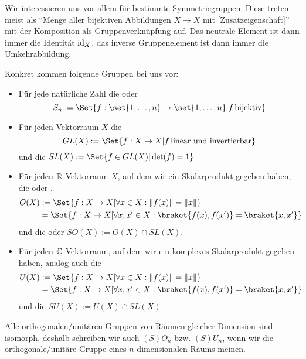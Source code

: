 \begin{example}
Wir interessieren uns vor allem für bestimmte Symmetriegruppen. Diese treten meist als \enquote{Menge aller bijektiven Abbildungen $X\to X$ mit [Zusatzeigenschaft]} mit der Komposition als Gruppenverknüpfung auf. Das neutrale Element ist dann immer die Identität $\operatorname{id}_X$, das inverse Gruppenelement ist dann immer die Umkehrabbildung.

Konkret kommen folgende Gruppen bei uns vor:
\begin{itemize}
\item Für jede natürliche Zahl die  oder 
\[S_n := \Set{f: \set{1,\ldots,n}\to\set{1,\ldots,n} | f\,\text{bijektiv}}\]
\item Für jeden Vektorraum $X$ die 
\[GL(X):=\Set{f: X\to X | f\,\text{linear und invertierbar}}\]
und die  $SL(X):=\Set{f\in GL(X) | \det(f)=1}$
\item Für jeden $\mathbb{R}$-Vektorraum $X$, auf dem wir ein Skalarprodukt gegeben haben, die  oder .
\begin{align*}
O(X) &:= \Set{f: X\to X | \forall x\in X: \norm{f(x)}=\norm{x}}\\
&=\Set{f: X\to X | \forall x,x'\in X: \braket{f(x),f(x')}=\braket{x,x'}}
\end{align*}
und die  oder  $SO(X) := O(X) \cap SL(X)$.
\item Für jeden $\mathbb{C}$-Vektorraum, auf dem wir ein komplexes Skalarprodukt gegeben haben, analog auch die 
\begin{align*}
U(X) &:= \Set{f: X\to X | \forall x\in X: \norm{f(x)}=\norm{x}}\\
&=\Set{f: X\to X | \forall x,x'\in X: \braket{f(x),f(x')}=\braket{x,x'}}
\end{align*}
und die  $SU(X) := U(X) \cap SL(X)$.
\end{itemize}
Alle orthogonalen/unitären Gruppen von Räumen gleicher Dimension sind isomorph, deshalb schreiben wir auch $(S)O_n$ bzw. $(S)U_n$, wenn wir die orthogonale/unitäre Gruppe eines $n$-dimensionalen Raums meinen.
\end{example}